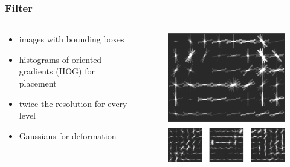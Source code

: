 \documentclass[xcolor=dvipsnames]{beamer}
\begin{document}
\begin{frame}
	\frametitle{Filter}
	\begin{columns}
		\begin{column}{0.6\textwidth}
			\begin{itemize}
				\item images with bounding boxes
				\item histograms of oriented gradients (HOG) for placement
				\item twice the resolution for every level
				\item Gaussians for deformation
			\end{itemize}
		\end{column}
		\begin{column}{0.4\textwidth}
			\begin{figure}
				\includegraphics[width=\textwidth]{img/exa.png}
			\end{figure}
		\end{column}
	\end{columns}
\end{frame}
\end{document}
